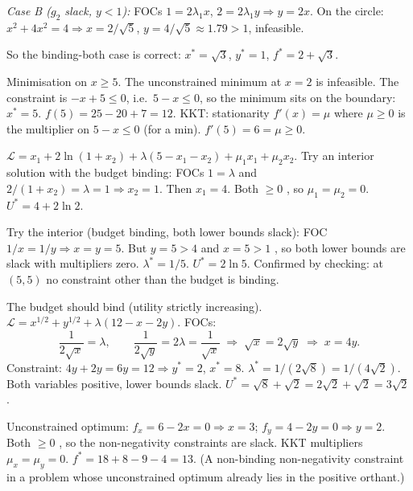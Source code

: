 \begin{solutions}
        \emph{Case B ($g_2$ slack, $y < 1$):} FOCs
        $1 = 2 \lambda_1 x$, $2 = 2 \lambda_1 y \Rightarrow y = 2 x$. On
        the circle: $x^2 + 4 x^2 = 4 \Rightarrow x = 2/\sqrt{5}$,
        $y = 4/\sqrt{5} \approx 1.79 > 1$, infeasible.

        So the binding-both case is correct: $x^* = \sqrt{3}$, $y^* = 1$,
        $f^* = 2 + \sqrt{3}$.

  \item Minimisation on $x \geq 5$. The unconstrained minimum at $x = 2$
        is infeasible. The constraint is $-x + 5 \leq 0$, i.e.\
        $5 - x \leq 0$, so the minimum sits on the boundary: $x^* = 5$.
        $f(5) = 25 - 20 + 7 = 12$. KKT: stationarity $f'(x) = \mu$ where
        $\mu \geq 0$ is the multiplier on $5 - x \leq 0$ (for a min).
        $f'(5) = 6 = \mu \geq 0$. \checkmark

  \item $\mathcal{L} = x_1 + 2 \ln(1 + x_2) + \lambda(5 - x_1 - x_2)
        + \mu_1 x_1 + \mu_2 x_2$. Try an interior solution with the budget
        binding: FOCs $1 = \lambda$ and
        $2/(1 + x_2) = \lambda = 1 \Rightarrow x_2 = 1$. Then $x_1 = 4$.
        Both $\geq 0$ \checkmark, so $\mu_1 = \mu_2 = 0$.
        $U^* = 4 + 2 \ln 2$.

  \item Try the interior (budget binding, both lower bounds slack): FOC
        $1/x = 1/y \Rightarrow x = y = 5$. But $y = 5 > 4$ \checkmark and
        $x = 5 > 1$ \checkmark, so both lower bounds are slack with
        multipliers zero. $\lambda^* = 1/5$. $U^* = 2 \ln 5$. Confirmed by
        checking: at $(5, 5)$ no constraint other than the budget is
        binding.

  \item The budget should bind (utility strictly increasing).
        $\mathcal{L} = x^{1/2} + y^{1/2} + \lambda(12 - x - 2 y)$. FOCs:
        \[
          \frac{1}{2 \sqrt{x}} = \lambda, \qquad
          \frac{1}{2 \sqrt{y}} = 2 \lambda = \frac{1}{\sqrt{x}}
          \;\Rightarrow\; \sqrt{x} = 2 \sqrt{y}
          \;\Rightarrow\; x = 4 y .
        \]
        Constraint: $4 y + 2 y = 6 y = 12 \Rightarrow y^* = 2$,
        $x^* = 8$. $\lambda^* = 1/(2 \sqrt{8}) = 1/(4 \sqrt{2})$. Both
        variables positive, lower bounds slack.
        $U^* = \sqrt{8} + \sqrt{2} = 2 \sqrt{2} + \sqrt{2} = 3 \sqrt{2}$.

  \item Unconstrained optimum: $f_x = 6 - 2 x = 0 \Rightarrow x = 3$;
        $f_y = 4 - 2 y = 0 \Rightarrow y = 2$. Both $\geq 0$ \checkmark,
        so the non-negativity constraints are slack. KKT multipliers
        $\mu_x = \mu_y = 0$. $f^* = 18 + 8 - 9 - 4 = 13$. (A non-binding
        non-negativity constraint in a problem whose unconstrained optimum
        already lies in the positive orthant.)


\end{solutions}
